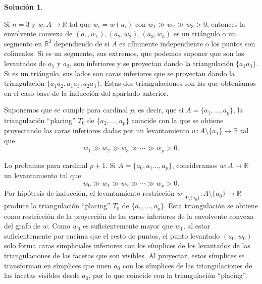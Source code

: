 \documentclass[10pt]{article}
\theoremstyle{definition}
\newtheorem*{sol}{Solución}
\newcommand{\RR}{\mathbb{R}}
\begin{document}
\begin{sol}
\begin{enumerate}[(a)]
    Si $n=3$ y $w:A\longrightarrow\RR$ tal que $w_i=w(a_i)$ con $w_1\gg w_2\gg w_3>0$, entonces la envolvente convexa de $(a_1,w_1),(a_2,w_2),(a_3,w_3)$ es un triángulo o un segmento en $\mathbb{R}^3$ dependiendo de si $A$ es afínmente independiente o los puntos son colineales. Si es un segmento, sus extremos, que podemos suponer que son los levantados de $a_1$ y $a_3$, son inferiores y se proyectan dando la triangulación $\{a_1a_3\}$. Si es un triángulo, sus lados son caras inferiores que se proyectan dando la triangulación $\{a_1a_2,a_1a_3,a_2a_3\}$. Estas dos triangulaciones son las que obteníamos en el caso base de la inducción del apartado anterior.
    
    Suponemos que se cumple para cardinal $p$, es decir, que si $A=\{a_1,\ldots,a_p\}$, la triangulación ``placing'' $T_0$ de $\{a_2,\ldots,a_p\}$ coincide con la que se obtiene proyectando las caras inferiores dadas por un levantamiento $w:A\setminus\{a_1\}\longrightarrow \RR$ tal que \[w_1\gg w_2\gg w_3\gg\cdots\gg w_p>0.\]
    
    Lo probamos para cardinal $p+1$. Si $A=\{a_0,a_1\ldots,a_p\}$, consideramos $w:A\longrightarrow\RR$ un levantamiento tal que 
    \[w_0\gg w_1\gg w_2\gg \cdots\gg w_p>0.\]
    Por hipótesis de inducción, el levantamiento restricción $w|_{A\setminus\{a_0\}}:A\setminus\{a_0\}\longrightarrow \RR$ produce la triangulación ``placing'' $T_0$ de $\{a_1,\ldots,a_p\}$. Esta triangulación se obtiene como restricción de la proyección de las caras inferiores de la envolvente convexa del grafo de $w$. Como $w_0$ es suficientemente mayor que $w_1$, al estar suficientemente por encima que el resto de puntos, el punto levantado $(a_0,w_0)$ solo forma caras simpliciales inferiores con los símplices de los levantados de las triangulaciones de las facetas que son visibles. Al proyectar, estos símplices se transforman en símplices que unen $a_0$ con los símplices de las triangulaciones de las facetas visibles desde $a_0$, por lo que coincide con la triangulación ``placing''. 
\end{enumerate}
\end{sol}
\end{document}
